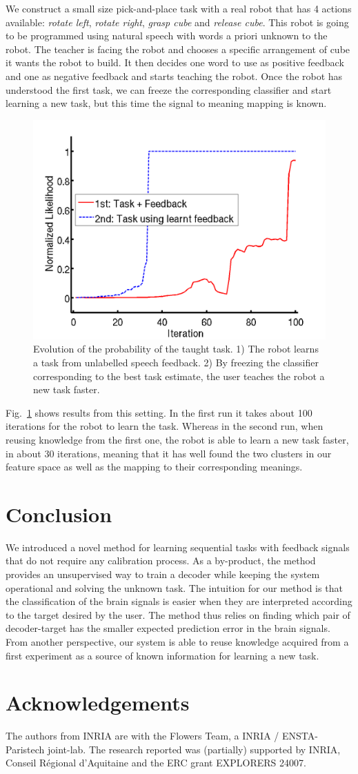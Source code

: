 \documentclass[conference]{IEEEtran}
\begin{document}
We construct a small size pick-and-place task with a real robot that has 4 actions available: \textit{rotate left}, \textit{rotate right}, \textit{grasp cube} and \textit{release cube}. This robot is going to be programmed using natural speech with words a priori unknown to the robot. The teacher is facing the robot and chooses a specific arrangement of cube it wants the robot to build. It then decides one word to use as positive feedback and one as negative feedback and starts teaching the robot. Once the robot has understood the first task, we can freeze the corresponding classifier and start learning a new task, but this time the signal to meaning mapping is known.

\begin{figure}[!htbp]
	\centering
		\includegraphics[width=0.5\columnwidth]{images/real}
	\caption{Evolution of the probability of the taught task. 1) The robot learns a task from unlabelled speech feedback. 2) By freezing the classifier corresponding to the best task estimate, the user teaches the robot a new task faster.}
	\label{Real}
\end{figure}

Fig.~\ref{Real} shows results from this setting. In the first run it takes about 100 iterations for the robot to learn the task. Whereas in the second run, when reusing knowledge from the first one, the robot is able to learn a new task faster, in about 30 iterations, meaning that it has well found the two clusters in our feature space as well as the mapping to their corresponding meanings.



\section{Conclusion}

We introduced a novel method for learning sequential tasks with feedback signals that do not require any calibration process. As a by-product, the method provides an unsupervised way to train a decoder while keeping the system operational and solving the unknown task. 
%
The intuition for our method is that the classification of the brain signals is easier when they are interpreted according to the target desired by the user. The method thus relies on finding which pair of decoder-target has the smaller expected prediction error in the brain signals. From another perspective, our system is able to reuse knowledge acquired from a first experiment as a source of known information for learning a new task.

\section*{Acknowledgements}
The authors from INRIA are with the Flowers Team, a INRIA / ENSTA-Paristech joint-lab. The research reported was (partially) supported by INRIA, Conseil R\'egional d'Aquitaine and the ERC grant EXPLORERS 24007.




\end{document}
